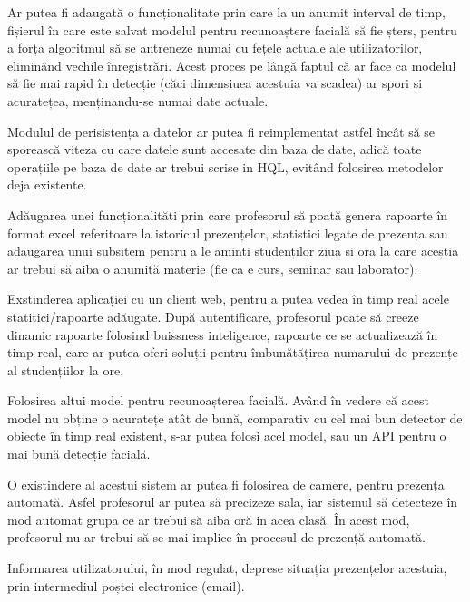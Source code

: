 \documentclass[a4paper, 12pt]{article}
\begin{document}
	Ar putea fi adaugată o funcționalitate prin care la un anumit interval de timp, fișierul în care este salvat modelul pentru recunoaștere facială să fie șters, pentru a forța algoritmul să se antreneze numai cu fețele actuale ale utilizatorilor, eliminând vechile înregistrări. Acest proces pe lângă faptul că ar face ca modelul să fie mai rapid în detecție (căci dimensiuea acestuia va scadea) ar spori și acuratețea, menținandu-se numai date actuale.
	
	Modulul de perisistența a datelor ar putea fi reimplementat astfel încât să se sporească viteza cu care datele sunt accesate din baza de date, adică toate operațiile pe baza de date ar trebui scrise in HQL, evitând folosirea metodelor deja existente.
	
	Adăugarea unei funcționalități prin care profesorul să poată genera rapoarte în format excel referitoare la istoricul prezențelor, statistici legate de prezența sau adaugarea unui subsitem pentru a le aminti studenților ziua și ora la care aceștia ar trebui să aiba o anumită materie (fie ca e curs, seminar sau laborator).
	
	Exstinderea aplicației cu un client web, pentru a putea vedea în timp real acele statitici/rapoarte adăugate. După autentificare, profesorul poate să creeze dinamic rapoarte folosind buissness inteligence, rapoarte ce se actualizează în timp real, care ar putea oferi soluții pentru îmbunătățirea numarului de prezențe al studențiilor la ore.
	
	Folosirea altui model pentru recunoașterea facială. Având în vedere că acest model nu obține o acuratețe atât de bună, comparativ cu cel mai bun detector de obiecte în timp real existent, s-ar putea folosi acel model, sau un API pentru o mai bună detecție facială.
	
	O existindere al acestui sistem ar putea fi folosirea de camere, pentru prezența automată. Asfel profesorul ar putea să precizeze sala, iar sistemul să detecteze în mod automat grupa ce ar trebui să aiba oră in acea clasă. În acest mod, profesorul nu ar trebui să se mai implice în procesul de prezență automată.
	
	Informarea utilizatorului, în mod regulat, deprese situația prezențelor acestuia, prin intermediul poștei electronice (email).
	
	
	
	
	\newpage 
	
	
\end{document}

